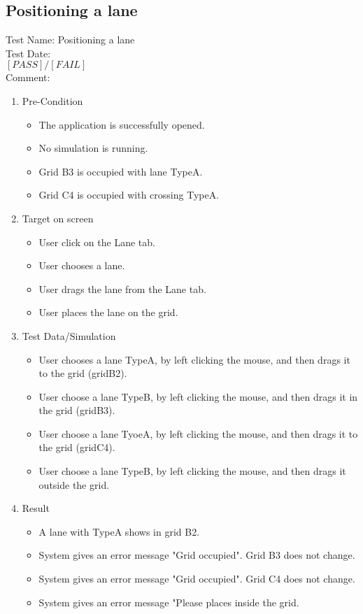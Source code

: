 \subsection{Positioning a lane}
Test Name: Positioning a lane \\Test Date: \\ $\left[ PASS \right] / \left[ FAIL \right]$\\Comment: \\
\begin{enumerate}
	\item Pre-Condition
	\begin{itemize}
		\item The application is successfully opened.
		\item No simulation is running.
		\item Grid B3 is occupied with lane TypeA.
		\item Grid C4 is occupied with crossing TypeA.
	\end{itemize}
	\item Target on screen
	\begin{itemize}
		\item User click on the Lane tab.
		\item User chooses a lane.
		\item User drags the lane from the Lane tab.
		\item User places the lane on the grid.
	\end{itemize}
	\item Test Data/Simulation
	\begin{itemize}
		\item User chooses a lane TypeA, by left clicking the mouse, and then drags it to the grid (gridB2).
		\item User choose a lane TypeB, by left clicking the mouse, and then drags it in the grid (gridB3).
		\item User choose a lane TyoeA, by left clicking the mouse, and then drags it to the grid (gridC4).
		\item User choose a lane TypeB, by left clicking the mouse, and then drags it outside the grid.
	\end{itemize}
	\item Result
	\begin{itemize}
		\item A lane with TypeA shows in grid B2.
		\item System gives an  error message "Grid occupied". Grid B3 does not change.
		\item System gives an  error message "Grid occupied". Grid C4 does not change.
		\item  System gives an error message "Please places inside the grid.
	\end{itemize}
\end{enumerate}

